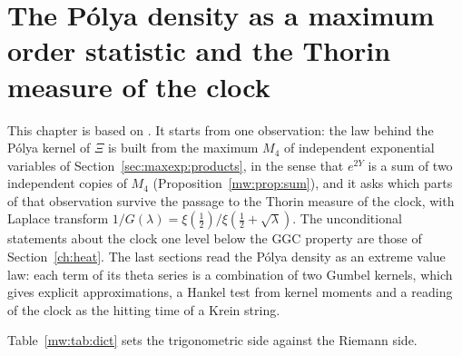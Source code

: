 \chapter{The P\'olya density as a maximum order statistic and the Thorin measure of the clock}\label{chap:maxwald}

This chapter is based on \cite{P26mw}. It starts from one observation: the law behind the P\'olya kernel of $\Xi$ is built from the maximum $M_4$ of independent exponential variables of Section~\ref{sec:maxexp:products}, in the sense that $e^{2Y}$ is a sum of two independent copies of $M_4$ (Proposition~\ref{mw:prop:sum}), and it asks which parts of that observation survive the passage to the Thorin measure of the clock, with Laplace transform $1/G(\lambda)=\xi(\frac12)/\xi(\frac12+\sqrt\lambda)$. The unconditional statements about the clock one level below the GGC property are those of Section~\ref{ch:heat}. The last sections read the P\'olya density as an extreme value law: each term of its theta series is a combination of two Gumbel kernels, which gives explicit approximations, a Hankel test from kernel moments and a reading of the clock as the hitting time of a Krein string.

Table~\ref{mw:tab:dict} sets the trigonometric side against the Riemann side.

